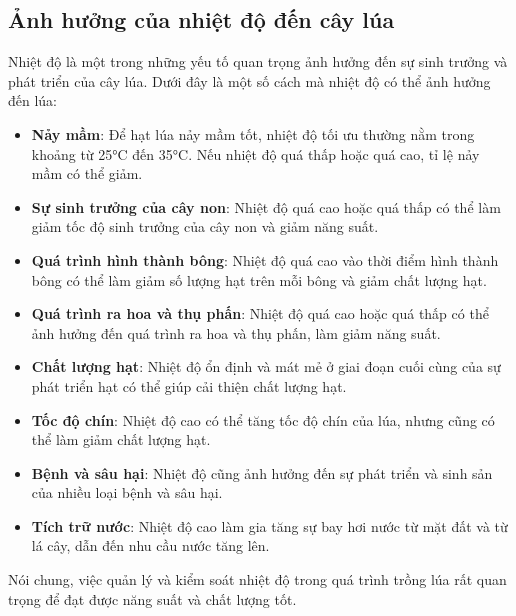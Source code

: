 \documentclass[12pt]{report}
\begin{document}
\subsection{Ảnh hưởng của nhiệt độ đến cây lúa} %
\label{sub:ảnh_hưởng_của_nhiệt_độ_đến_cây_lúa}
\begin{flushleft}
	Nhiệt độ là một trong những yếu tố quan trọng ảnh hưởng đến sự sinh trưởng và phát triển của cây lúa. Dưới đây là một số cách mà nhiệt độ có thể ảnh hưởng đến lúa:

	\begin{itemize}
		\item \textbf{Nảy mầm}: Để hạt lúa nảy mầm tốt, nhiệt độ tối ưu thường nằm trong khoảng từ 25°C đến 35°C. Nếu nhiệt độ quá thấp hoặc quá cao, tỉ lệ nảy mầm có thể giảm.

		\item \textbf{Sự sinh trưởng của cây non}: Nhiệt độ quá cao hoặc quá thấp có thể làm giảm tốc độ sinh trưởng của cây non và giảm năng suất.

		\item \textbf{Quá trình hình thành bông}: Nhiệt độ quá cao vào thời điểm hình thành bông có thể làm giảm số lượng hạt trên mỗi bông và giảm chất lượng hạt.

		\item \textbf{Quá trình ra hoa và thụ phấn}: Nhiệt độ quá cao hoặc quá thấp có thể ảnh hưởng đến quá trình ra hoa và thụ phấn, làm giảm năng suất.

		\item \textbf{Chất lượng hạt}: Nhiệt độ ổn định và mát mẻ ở giai đoạn cuối cùng của sự phát triển hạt có thể giúp cải thiện chất lượng hạt.

		\item \textbf{Tốc độ chín}: Nhiệt độ cao có thể tăng tốc độ chín của lúa, nhưng cũng có thể làm giảm chất lượng hạt.

		\item \textbf{Bệnh và sâu hại}: Nhiệt độ cũng ảnh hưởng đến sự phát triển và sinh sản của nhiều loại bệnh và sâu hại.

		\item \textbf{Tích trữ nước}: Nhiệt độ cao làm gia tăng sự bay hơi nước từ mặt đất và từ lá cây, dẫn đến nhu cầu nước tăng lên.
	\end{itemize}

	Nói chung, việc quản lý và kiểm soát nhiệt độ trong quá trình trồng lúa rất quan trọng để đạt được năng suất và chất lượng tốt.
	\\[\baselineskip]


\end{flushleft}
\end{document}
